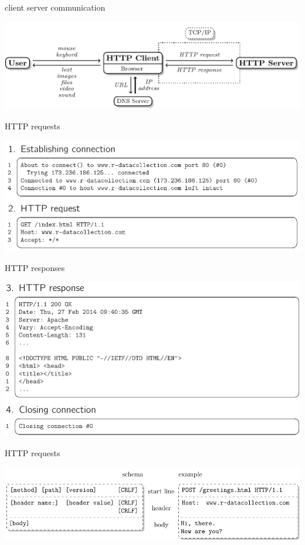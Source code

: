 \documentclass[ignorenonframetext,]{beamer}
\begin{document}
\begin{frame}{client server communication}

\includegraphics{fig/clientserver.png}

\end{frame}

\begin{frame}{HTTP requests}

\includegraphics{fig/request.png}

\end{frame}

\begin{frame}{HTTP responses}

\includegraphics{fig/response.png}

\end{frame}

\begin{frame}{HTTP requests}

\includegraphics{fig/httprequest.pdf}

\end{frame}
\end{document}
